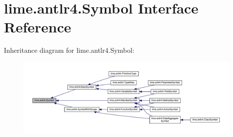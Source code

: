 \hypertarget{interfacelime_1_1antlr4_1_1Symbol}{}\section{lime.\+antlr4.\+Symbol Interface Reference}
\label{interfacelime_1_1antlr4_1_1Symbol}


Inheritance diagram for lime.\+antlr4.\+Symbol\+:
\nopagebreak
\begin{figure}[H]
\begin{center}
\leavevmode
\includegraphics[width=350pt]{interfacelime_1_1antlr4_1_1Symbol__inherit__graph}
\end{center}
\end{figure}
